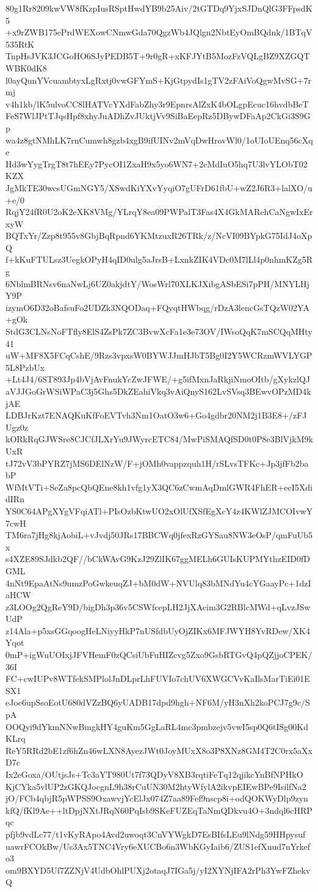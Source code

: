 80g1Rr8209kwVW8fKzpIusRSptHwdYB9b25Aiv/2tGTDq9YjxSJDnQlG3FFpsdK5
+x9rZWB175ePrdWEXowCNmwGda70QgzWb4JQlgn2NbtEyOmBQdnk/1BTqV535RtK
TnpHsJVK3JCGoHO6SJyPEDB5T+9r0gR+xKFJYtB5MozFzVQLgBZ9XZGQTWBK0dK8
l0ayQunYVcuambtyxLgRxtj0vwGFYmS+KjGtpydIs1gTV2zFAiVoQgwMvSG+7rmj
v4h1kb/lK5ulvoCC8lHATVcYXdFabZhy3r9EpnrsAlZxK4bOLgpEcuc16hvdbBeT
FeS7WlJPtTJqsHpf8xhyJuADhZvJUktjVv9SiBaEepRz5DBywDFaAp2CkGi3S9Gp
wa4z8gtNMhLK7rnCumwh8gzb4xgB9ifUINv2mVqDwHrovWl0/1oUIoUEnq56cXqe
Hd3wYygTrgT8t7hEEy7PycOI1ZxaH9x5yo6WN7+2cMdIuO5hq7U3lvYLObT02KZX
JgMkTE30wcsUGmNGY5/XSwdKiYXvYyqiO7gUFrD61fbU+wZ2J6R3+lalXO/u+e/0
RqjY24fR0U2oK2eXK8VMg/YLrqY8ea09PWPalT3Fas4X4GkMARehCaNgwIxErxyW
BQTxYr/Zzp8t955v8GbjBqRpnd6YKMtzuxR26TRk/z/NcVI09BYpkG75IdJ4oXpQ
f+kKuFTULsz3UegkOPyH4qID0ulg5aJrsB+LxnkZIK4VDc0M7lLl4p0nhmKZg5Rg
6NblmBRNsv6naNwLj6UZ0akjdtY/WosWrl70XLKJXibgASbESi7pPH/MNYLHjY9P
izymO6D32oBafsuFo2UDZk3NQODaq+FQyqtHWbqg/rDzA3lencGsTQzW02YA+gOk
StdG3CLNsNoFTfly8ElS4ZsPk7ZC3BvwXcFa1e3e73OV/IWsoQqK7mSCQqMHty41
uW+MF8X5FCqCshE/9Rzs3vpxsW0BYWJJmHJbT5Bg0I2Y5WCRzmWVLYGP5L8PzbUx
+Lt4J4/6ST893Jp4bVjAvFnukYcZwJFWE/+g5ifMxnJaRkjiNmoOItb/gXykzlQJ
aVJJGoGrWSiWPaC3j5Ghs5DkZEahiVkq3vAiQnyS162LvSVsq3BEwvOPzMD4kjAE
LDBJrKzt7ENAQKuKfFoEVTvh3Nm1OatO3w6+Go4gdbr20NM2j1B3E8+/zFJUgz0z
kORkRqGJWSre8CJCfJLXrYu9JWyrcETC84/MwPiSMAQfSD0t0P8e3BlVjkM9kUxR
tJ72vV3bPYRZ7jMS6DElNzW/F+jOMh0vappzquh1H/rSLvsTFKc+Jp3jfFb2babP
WfMtVTi+SeZa8pcQbQEne8kh1vfg1yX3QC6zCwmAqDmlGWR4FhER+ecI5XdidIRn
YS0C64APgXYgVFqiATl+PIsOzbKtwUO2xOlUfXSfEgXcY4z4KWlZJMCOIvwY7cwH
TM6ra7jHg8kjAobiL+vJvdj50JRs17BBCWq0jfexRzGYSau8NW3eOsP/qmFuUb5x
s4XZE89SJdkb2QF//bCkWAvG9KzJ29ZlIK67ggMELh6GUIsKUPMYthzEID0fDGML
4nNt9EpaAtNs9umzPoGwkeuqZJ+bM0dW+NVUlq83bMNdYu4cYGaayPc+1dzIaHCW
z3LOOg2QgReY9D/bigDh3p36v5CSWfcepLH2JjXAcim3G2RBlcMWd+qLvzJSwUdP
z14Ala+p5xsGGqoogHeLNiyyHkP7nUSfdbUyOjZIKx6MFJWYH8YvRDew/XK4Yqot
0mP+igWuUOIxjJFVHemF0zQCsiUbFuHIZcvg5Zxo9GsbRTGvQ4pQZjjoCPEK/36I
FC+cwIUPv8WTfekSMPlolJnDLprLhFUVIo7chUV6XWGCVvKaIlsMarTiEi01ESX1
eJoe6upSsoEotU680dVZzBQ6yUADB17dpd9hgh+NF6M/yH3nXh2koPCJ7g9c/SpA
OOQyi9dYkmNNwBmgkHY4guKm5GgLaRL4mc3pmbzejv5vwI5sp0Q6tISg00KdKLrq
ReY5RRd2bE1zf6hZn46wLXN8AyezJWt0JoyMUxX8o3P8XNz8GM4T2C0rx5aXxD7c
Ix2eGoxa/OUtjsJs+Tc3aYT980Ut7f73QDyV8XB3rqtiFeTq12qjikcYnBfNPHkO
KjCYka5vlUP2zGKQJocgnL9h38rCuUN30M2htyWfylA2ikvpEIEwBPe9IsilfNa2
jO/FCb4qbjR5pWPSS9OxawvjYcElJx074Z7aa89Fef9nscp8i+odQOKWyDlp9zyn
kfQ/fKl9Ae++ltDpjNXtJRqN60PqIsb9SKeFUZEqTaNmQDkvu4O+3ndql6cHRPqc
pfjb9vdLc77/t1vKyRApo4Avd2uwoqt3CnVYWgkD7EsBIfsLEu9lNdg59HHpysuf
uawrFCOkBw/Us3Ax5TNC4Vry6eXUCBo6n3WbKGyIaib6/ZUS1efXuud7nYrkefo3
om9BXYD5Uf7ZZNjV4UdbOhlPUXj2otaqJ7IGa5j/yI2XYNjIFA2rPh3YwFZhekvQ
